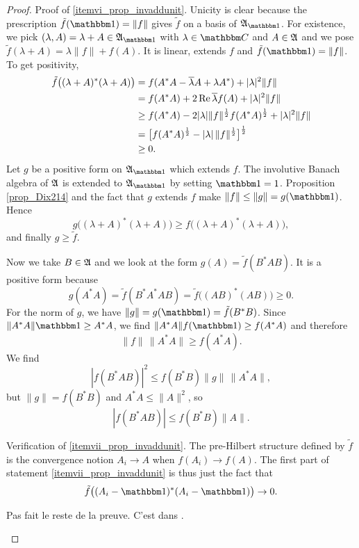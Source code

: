 \begin{proof}
Proof of \ref{itemvi_prop_invaddunit}. Unicity is clear because the prescription $\tilde f(\cun)=\| f \|$ gives $\tilde f$ on a basis of $\cA_{\cun}$. For existence, we pick $(\lambda,A)=\lambda+A\in\cA_{\cun}$ with $\lambda\in\eC$ and $A\in\mathfrak{A}$ and we pose $\tilde f(\lambda+A)=\lambda\| f \|+f(A)$. It is linear, extends $f$ and $\tilde f(\cun)=\| f \|$. To get positivity,
\begin{equation}
\begin{split}
 \tilde f\big( (\lambda+A)^*(\lambda+A) \big)&=f(A^*A-\overline{ \lambda }A+\lambda A^*)+| \lambda |^2\| f \|\\
        &=f(A^*A)+2\operatorname{Re}\overline{ \lambda }f(A)+| \lambda |^2\| f \|\\
        &\geq f(A^*A)-2| \lambda |\| f \|^{\frac{ 1 }{2}}f(A^*A)^{\frac{ 1 }{2}}+| \lambda |^2\| f \|\\
        &=\big[ f(A^*A)^{\frac{ 1 }{2}}-| \lambda |\,\| f \|^{\frac{ 1 }{2}} \big]^{\frac{ 1 }{2}}\\&\geq 0.
\end{split}
\end{equation}
Let $g$ be a positive form on $\cA_{\cun}$ which extends $f$. The involutive Banach algebra of $\mathfrak{A}$ is extended to $\cA_{\cun}$ by setting $\cun=1$. Proposition \ref{prop_Dix214} and the fact that $g$ extends $f$ make $\| f \|\leq\| g \|=g(\cun)$. Hence
\[ 
  g\big( (\lambda+A)^*(\lambda+A) \big)\geq f\big( (\lambda+A)^*(\lambda+A) \big),
\]
and finally $g\geq\tilde f$.

Now we take $B\in\mathfrak{A}$ and we look at the form $g(A)=\tilde f(B^*AB)$. It is a positive form because
\[ 
  g(A^*A)=\tilde f(B^*A^*AB)=\tilde f\big( (AB)^*(AB) \big)\geq 0.
\]
For the norm of $g$, we have $\| g \|=g(\cun)=\tilde f(B^*B)$. Since $\| A^*A \|\cun\geq A^*A$, we find $\| A^*A \|f(\cun)\geq f(A^*A)$ and therefore
\[ 
  \| f \|\,\| A^*A \|\geq f(A^*A).
\]
We find
\[ 
  | f(B^*AB) |^2\leq f(B^*B)\| g \|\,\| A^*A \|,
\]
but $\| g \|=f(B^*B)$ and $A^*A\leq\| A \|^2$, so
\begin{equation}
| f(B^*AB) |\leq f(B^*B)\| A \|.
\end{equation}

Verification of \ref{itemvii_prop_invaddunit}. The pre-Hilbert structure defined by $\tilde f$ is the convergence notion $A_i\to A$ when $f(A_i)\to f(A)$. The first part of statement \ref{itemvii_prop_invaddunit} is thus just the fact that
\[ 
  \tilde f\big( (A_i-\cun)^*(A_i-\cun) \big)\to 0.
\]
\begin{probleme}
Pas fait le reste de la preuve. C'est dans \cite{Dixmier}.
\end{probleme}

\end{proof}


